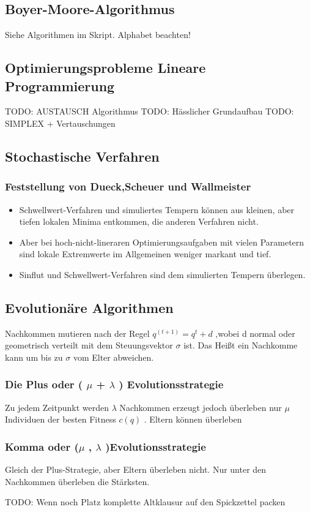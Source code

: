\subsection{Boyer-Moore-Algorithmus}
Siehe Algorithmen im Skript. Alphabet beachten!


\subsection{Optimierungsprobleme Lineare Programmierung}

TODO: AUSTAUSCH Algorithmus
TODO: Hässlicher Grundaufbau
TODO: SIMPLEX + Vertauschungen


\subsection{Stochastische Verfahren}
\subsubsection{Feststellung von 
Dueck,Scheuer und Wallmeister}
\begin{itemize}
	\item Schwellwert-Verfahren 
und simuliertes Tempern können aus 
kleinen, aber tiefen lokalen Minima 
entkommen, die anderen Verfahren 
nicht.
	\item Aber bei 
hoch-nicht-lineraren 
Optimierungsaufgaben mit vielen 
Parametern sind lokale Extremwerte im 
Allgemeinen weniger markant und tief.
	\item Sinflut und 
Schwellwert-Verfahren sind dem 
simulierten Tempern überlegen.
\end{itemize}


\subsection{Evolutionäre Algorithmen}
Nachkommen mutieren nach der Regel 
$q^(t+1) = q^t +d$ ,wobei d normal 
oder geometrisch verteilt mit dem 
Steuungsvektor $\sigma$ ist. Das 
Heißt 
ein Nachkomme kann um bis zu $\sigma$ 
vom Elter abweichen.

\subsubsection{ Die Plus oder ( $\mu$ 
+ 
$\lambda$ ) Evolutionsstrategie}
Zu jedem Zeitpunkt werden $\lambda$ 
Nachkommen erzeugt jedoch überleben 
nur $\mu$ Individuen der besten 
Fitness 
$c(q)$ . Eltern können überleben

\subsubsection{Komma oder 
($\mu$ , $\lambda$ 
)Evolutionsstrategie}
Gleich der Plus-Strategie, aber 
Eltern überleben nicht. Nur unter den 
Nachkommen überleben die Stärksten.

TODO: Wenn noch Platz komplette Altklausur auf den Spickzettel packen
